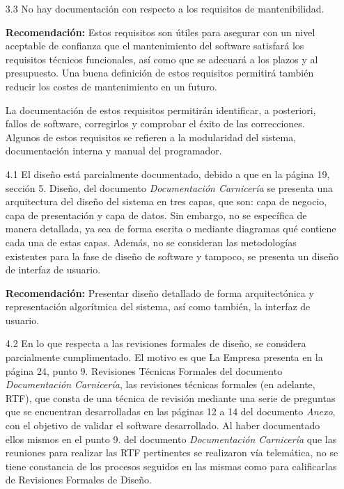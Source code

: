 \documentclass[a4paper,12pt]{report}
\begin{document}
\begin{enumerate}
    \item[3.3] No hay documentación con respecto a los requisitos de mantenibilidad.\\
    \vspace{0.05cm}
    
    \textbf{Recomendación:} Estos requisitos son útiles para asegurar con un nivel aceptable de confianza
    que el mantenimiento del software satisfará los requisitos técnicos funcionales, así como que se 
    adecuará a los plazos y al presupuesto. Una buena definición de estos requisitos permitirá también 
    reducir los costes de mantenimiento en un futuro.
    
    La documentación de estos requisitos permitirán identificar, a posteriori, fallos de software, 
    corregirlos y comprobar el éxito de las correcciones. Algunos de estos requisitos se refieren a la modularidad del sistema, documentación interna y manual del programador. \\
    
    \vspace{0.05cm}
    
    \item[4.1] El diseño está parcialmente documentado, debido a que en la
    página 19, sección 5. Diseño, del documento \textit{Documentación
    Carnicería} se presenta una arquitectura del diseño del sistema
    en tres capas, que son: capa de negocio, capa de presentación y capa de
    datos. Sin embargo, no se específica de manera detallada, ya sea de
    forma escrita o mediante diagramas qué contiene cada una de
    estas capas. Además, no se consideran las metodologías existentes para
    la fase de diseño de software y tampoco, se presenta un diseño de
    interfaz de usuario.\\
    \vspace{0.05cm}
        
    \textbf{Recomendación:} Presentar diseño detallado de forma arquitectónica y representación algorítmica del sistema, así como también,  la interfaz de usuario. \\
    
    
    \item[4.2] En lo que respecta a las revisiones formales de diseño, se considera parcialmente
    cumplimentado. El motivo es que La Empresa presenta en la página 24, punto 9. Revisiones Técnicas
    Formales del documento \textit{Documentación Carnicería}, las revisiones técnicas formales
    (en adelante, RTF), que consta de una técnica de revisión mediante una serie de preguntas que
    se encuentran desarrolladas en las páginas 12 a 14 del documento \textit{Anexo}, con el objetivo de
    validar el software desarrollado. Al haber documentado ellos mismos en el punto 9. del documento
    \textit{Documentación Carnicería} que las reuniones para realizar las RTF pertinentes se realizaron
    vía telemática, no se tiene constancia de los procesos seguidos en las mismas como para calificarlas
    de Revisiones Formales de Diseño.\\


\end{enumerate}
\end{document}
